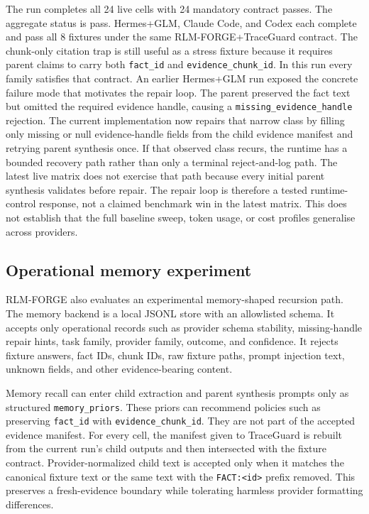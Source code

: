 \documentclass[11pt,a4paper]{article}
\begin{document}
The run completes all 24 live cells with 24 mandatory contract passes. The
aggregate status is pass. Hermes+GLM, Claude Code, and Codex each complete
and pass all 8 fixtures under the same RLM-FORGE+TraceGuard contract. The
chunk-only citation trap is still useful as a stress fixture because it
requires parent claims to carry both \texttt{fact\_id} and
\texttt{evidence\_chunk\_id}. In this run every family satisfies that
contract. An earlier Hermes+GLM run exposed the concrete failure mode that
motivates the repair loop. The parent preserved the fact text but omitted the
required evidence handle, causing a \texttt{missing\_evidence\_handle}
rejection. The current implementation now repairs that narrow class by filling
only missing or null evidence-handle fields from the child evidence manifest
and retrying parent synthesis once. If that observed class recurs, the runtime
has a bounded recovery path rather than only a terminal reject-and-log path.
The latest live matrix does not exercise that path because every initial
parent synthesis validates before repair. The repair loop is therefore a
tested runtime-control response, not a claimed benchmark win in the latest
matrix. This does not establish that the full baseline sweep, token usage, or
cost profiles generalise across providers.

\subsection{Operational memory experiment}
\label{sec:memory-experiment}

RLM-FORGE also evaluates an experimental memory-shaped recursion path. The
memory backend is a local JSONL store with an allowlisted schema. It accepts
only operational records such as provider schema stability, missing-handle
repair hints, task family, provider family, outcome, and confidence. It
rejects fixture answers, fact IDs, chunk IDs, raw fixture paths, prompt
injection text, unknown fields, and other evidence-bearing content.

Memory recall can enter child extraction and parent synthesis prompts only as
structured \texttt{memory\_priors}. These priors can recommend policies such
as preserving \texttt{fact\_id} with \texttt{evidence\_chunk\_id}. They are
not part of the accepted evidence manifest. For every cell, the manifest
given to TraceGuard is rebuilt from the current run's child outputs and then
intersected with the fixture contract. Provider-normalized child text is
accepted only when it matches the canonical fixture text or the same text
with the \texttt{FACT:<id>} prefix removed. This preserves a fresh-evidence
boundary while tolerating harmless provider formatting differences.
\end{document}
